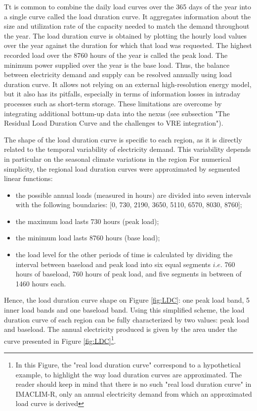 Tt is common to combine the daily load curves over the 365 days of the year into a single curve called the load duration curve. It aggregates information about the size and utilization rate of the capacity needed to match the demand throughout the year.
The load duration curve is obtained by plotting the hourly load values over the year against the duration for which that load was requested. The highest recorded load over the 8760 hours of the year is called the peak load. The minimum power supplied over the year is the base load. Thus, the balance between electricity demand and supply can be resolved annually using load duration curve. It allows not relying on an external high-resolution energy model, but it also has its pitfalls, especially in terms of information losses in intraday processes such as short-term storage. These limitations are overcome by integrating additional bottum-up data into the nexus (see subsection "The Residual Load Duration Curve and the challenges to VRE integration").

The shape of the load duration curve is specific to each region, as it is directly related to the temporal variability of electricity demand. This variability depends in particular on the seasonal climate variations in the region
For numerical simplicity, the regional load duration curves were approximated by segmented linear functions:
\begin{itemize}
    \item the possible annual loads (measured in hours) are divided into seven intervals with the following boundaries: [0, 730, 2190, 3650, 5110, 6570, 8030, 8760];
    \item the maximum load lasts 730 hours (peak load);
    \item the minimum load lasts 8760 hours (base load);
    \item the load level for the other periods of time is calculated by dividing the interval between baseload and peak load into six equal segments $i.e.$ 760 hours of baseload, 760 hours of peak load, and five segments in between of 1460 hours each.
\end{itemize}

Hence, the load duration curve shape on Figure \ref{fig:LDC}: one peak load band, 5 inner load bands and one baseload band.
Using this simplified scheme, the load duration curve of each region can be fully characterized by two values: peak load and baseload. The annual electricity produced is given by the area under the curve presented in Figure \ref{fig:LDC}\footnote{In this Figure, the "real load duration curve" correspond to a hypothetical example, to highlight the way load duration curves are approximated. The reader should keep in mind that there is no such "real load duration curve" in IMACLIM-R, only an annual electricity demand from which an approximated load curve is derived}.


